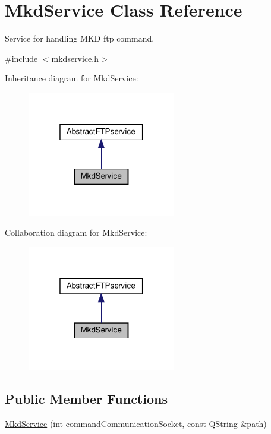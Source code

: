 \hypertarget{classMkdService}{}\section{Mkd\+Service Class Reference}
\label{classMkdService}


Service for handling M\+KD ftp command.  




{\ttfamily \#include $<$mkdservice.\+h$>$}



Inheritance diagram for Mkd\+Service\+:\nopagebreak
\begin{figure}[H]
\begin{center}
\leavevmode
\includegraphics[width=184pt]{da/ddb/classMkdService__inherit__graph}
\end{center}
\end{figure}


Collaboration diagram for Mkd\+Service\+:\nopagebreak
\begin{figure}[H]
\begin{center}
\leavevmode
\includegraphics[width=184pt]{d3/d3f/classMkdService__coll__graph}
\end{center}
\end{figure}
\subsection*{Public Member Functions}
\begin{DoxyCompactItemize}
\item 
\hyperlink{classMkdService_a3651f694017141915da3d946c98bd33d}{Mkd\+Service} (int command\+Communication\+Socket, const Q\+String \&path)
\end{DoxyCompactItemize}
